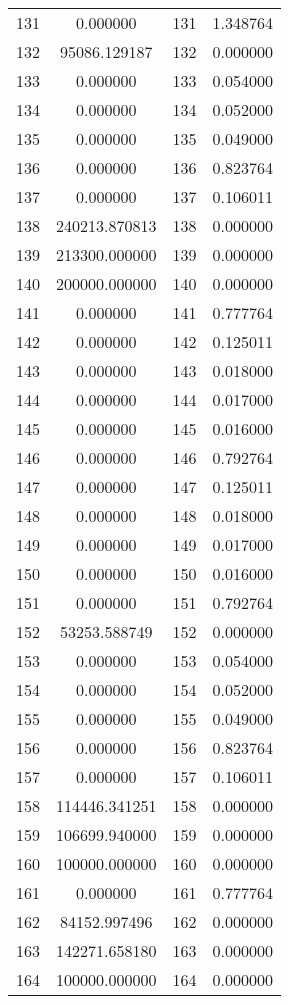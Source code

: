 \documentclass[12pt]{article}
\begin{document}
\begin{longtable}{@{}cccc@{}}
131 & 0.000000 & 131 & 1.348764 \\
132 & 95086.129187 & 132 & 0.000000 \\
133 & 0.000000 & 133 & 0.054000 \\
134 & 0.000000 & 134 & 0.052000 \\
135 & 0.000000 & 135 & 0.049000 \\
136 & 0.000000 & 136 & 0.823764 \\
137 & 0.000000 & 137 & 0.106011 \\
138 & 240213.870813 & 138 & 0.000000 \\
139 & 213300.000000 & 139 & 0.000000 \\
140 & 200000.000000 & 140 & 0.000000 \\
141 & 0.000000 & 141 & 0.777764 \\
142 & 0.000000 & 142 & 0.125011 \\
143 & 0.000000 & 143 & 0.018000 \\
144 & 0.000000 & 144 & 0.017000 \\
145 & 0.000000 & 145 & 0.016000 \\
146 & 0.000000 & 146 & 0.792764 \\
147 & 0.000000 & 147 & 0.125011 \\
148 & 0.000000 & 148 & 0.018000 \\
149 & 0.000000 & 149 & 0.017000 \\
150 & 0.000000 & 150 & 0.016000 \\
151 & 0.000000 & 151 & 0.792764 \\
152 & 53253.588749 & 152 & 0.000000 \\
153 & 0.000000 & 153 & 0.054000 \\
154 & 0.000000 & 154 & 0.052000 \\
155 & 0.000000 & 155 & 0.049000 \\
156 & 0.000000 & 156 & 0.823764 \\
157 & 0.000000 & 157 & 0.106011 \\
158 & 114446.341251 & 158 & 0.000000 \\
159 & 106699.940000 & 159 & 0.000000 \\
160 & 100000.000000 & 160 & 0.000000 \\
161 & 0.000000 & 161 & 0.777764 \\
162 & 84152.997496 & 162 & 0.000000 \\
163 & 142271.658180 & 163 & 0.000000 \\
164 & 100000.000000 & 164 & 0.000000 \\

\end{longtable}
\end{document}
